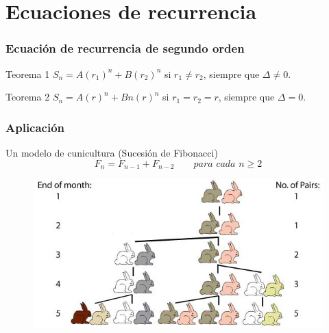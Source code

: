 \section{Ecuaciones de recurrencia}

\begin{frame}
\frametitle{Ecuación de recurrencia de segundo orden}

\begin{block}{Teorema 1}
$S_n = A(r_1)^n + B(r_2)^n$ si $r_1 \neq r_2$, siempre que $\Delta\neq0$.
\end{block}

\begin{block}{Teorema 2}
$S_n = A(r)^n + Bn(r)^n$ si $r_1 = r_2 = r$, siempre que $\Delta=0$.
\end{block}
\end{frame}

\begin{frame}
\frametitle{Aplicación}

\begin{block}{Un modelo de cunicultura (Sucesión de Fibonacci)}
$$F_n = F_{n-1} + F_{n-2} \qquad \textit{para cada $n \geq 2$}$$
\end{block}

\begin{block}{}
	\begin{figure}
		\centering
		\includegraphics[scale=0.40]{conejos.jpg}
	\end{figure}
\end{block}
\end{frame}